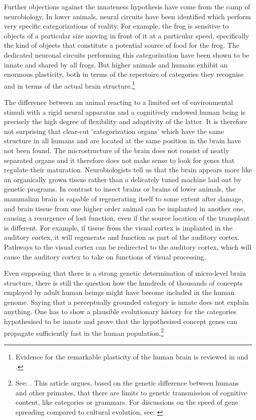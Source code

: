 Further objections against the innateness hypothesis have come from the camp 
of neurobiology. In lower animals, neural circuits have been identified which perform 
very specific categorizations of reality. For example, the 
frog is sensitive to objects of a particular
size moving in front of it at a particular speed, specifically the
kind of objects that constitute a potential 
source of food for the frog. The dedicated neuronal 
circuits performing this categorization have been 
shown to be innate and shared by all frogs. But higher 
animals and humans
exhibit an enormous plasticity, both in terms of the 
repertoire of categories they recognise and in terms of 
the actual brain structure.\footnote{
Evidence for the remarkable plasticity of the human 
brain is reviewed in \cite{Edelman:1987}and \cite{Elman:1998}. }

The difference between an animal
reacting to a limited set of environmental stimuli with 
a rigid neural apparatus and a cognitively endowed
human being is precisely the high degree of flexibility and 
adaptivity of the latter.
It is therefore not surprising that clear-cut 
`categorization organs' which have the same structure in 
all humans and are located at the same position in the 
brain have not been found. The microstructure of the
brain does not consist of
neatly separated organs and it therefore does not make 
sense to look for genes that regulate their maturation. 
Neurobiologists tell us that 
the brain appears more like an organically grown 
tissue rather than a delicately tuned machine laid
out by genetic programs. In contrast to insect brains or 
brains of lower animals, the mammalian brain is 
capable of regenerating itself to some extent after
damage, and brain tissue
from one higher order animal can be implanted in another
one, causing a resurgence of lost function, even if the 
source location of the transplant is different. 
For example, if tissue from the visual cortex is
implanted in the auditory cortex, it will 
regenerate and function as part of the auditory 
cortex. Pathways to the visual cortex can be
redirected to the auditory cortex, which will cause 
the auditory cortex to take on functions of visual processing. 

Even supposing that there is a strong genetic
determination of micro-level brain structure, there is 
still the question how the hundreds of thousands of concepts 
employed by adult human beings might have become 
included in the human genome. Saying that a perceptually 
grounded category is innate does not explain anything.
One has to show a plausible evolutionary history for 
the categories hypothesised to be innate and prove 
that the hypothesised concept genes can propagate sufficiently 
fast in the human population.\footnote{
See: \cite{Worden:1995}. 
This article argues, based on the genetic difference
between humans and other primates, that there are limits 
to genetic transmission of cognitive content, like 
categories or grammars. For discussions on the speed
of gene spreading compared to cultural evolution, 
see: \cite{Cavalli:1995}}

